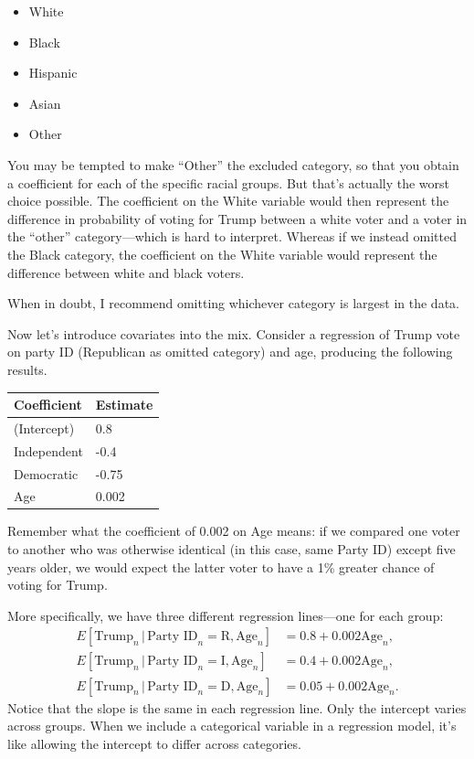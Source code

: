 \documentclass[
  12pt,
  oneside,openany]{book}
\providecommand{\tightlist}{%
  \setlength{\itemsep}{0pt}\setlength{\parskip}{0pt}}
\begin{document}
\begin{itemize}
\tightlist
\item
  White
\item
  Black
\item
  Hispanic
\item
  Asian
\item
  Other
\end{itemize}

You may be tempted to make ``Other'' the excluded category, so that you obtain a coefficient for each of the specific racial groups. But that's actually the worst choice possible. The coefficient on the White variable would then represent the difference in probability of voting for Trump between a white voter and a voter in the ``other'' category---which is hard to interpret. Whereas if we instead omitted the Black category, the coefficient on the White variable would represent the difference between white and black voters.

When in doubt, I recommend omitting whichever category is largest in the data.

Now let's introduce covariates into the mix. Consider a regression of Trump vote on party ID (Republican as omitted category) and age, producing the following results.

\begin{longtable}[]{@{}ll@{}}
\toprule
Coefficient & Estimate\tabularnewline
\midrule
\endhead
(Intercept) & 0.8\tabularnewline
Independent & -0.4\tabularnewline
Democratic & -0.75\tabularnewline
Age & 0.002\tabularnewline
\bottomrule
\end{longtable}

Remember what the coefficient of 0.002 on Age means: if we compared one voter to another who was otherwise identical (in this case, same Party ID) except five years older, we would expect the latter voter to have a 1\% greater chance of voting for Trump.

More specifically, we have three different regression lines---one for each group:
\[
\begin{aligned}
  E[\text{Trump}_n \,|\, \text{Party ID}_n = \text{R}, \text{Age}_n] &= 0.8 + 0.002 \text{Age}_n, \\
  E[\text{Trump}_n \,|\, \text{Party ID}_n = \text{I}, \text{Age}_n] &= 0.4 + 0.002 \text{Age}_n, \\
  E[\text{Trump}_n \,|\, \text{Party ID}_n = \text{D}, \text{Age}_n] &= 0.05 + 0.002 \text{Age}_n.
\end{aligned}
\]
Notice that the slope is the same in each regression line. Only the intercept varies across groups. When we include a categorical variable in a regression model, it's like allowing the intercept to differ across categories.
\end{document}
